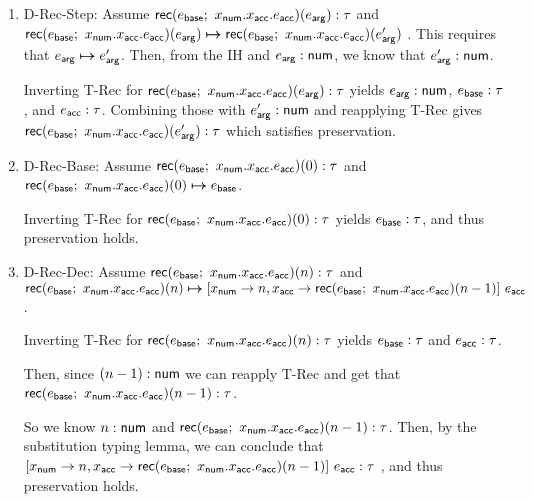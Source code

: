 \documentclass[11pt]{article}
\begin{document}
\begin{enumerate}
    \item D-Rec-Step: Assume 
    $\mathsf{rec}(e_{\mathsf{base}}; ~ x_{\mathsf{num}}.x_{\mathsf{acc}}.e_{\mathsf{acc}})(e_{\mathsf{arg}}) : \tau$
    and 
    $\mathsf{rec}(e_{\mathsf{base}}; ~ x_{\mathsf{num}}.x_{\mathsf{acc}}.e_{\mathsf{acc}})(e_{\mathsf{arg}}) \boldsymbol{\mapsto} \mathsf{rec}(e_{\mathsf{base}}; ~ x_{\mathsf{num}}.x_{\mathsf{acc}}.e_{\mathsf{acc}})(e_{\mathsf{arg}}')$
    . 
    This requires that $e_{\mathsf{arg}} \boldsymbol{\mapsto} e_{\mathsf{arg}}'$. Then, from the IH and 
    $e_{\mathsf{arg}} : \mathsf{num}$, we know that $e_{\mathsf{arg}}' : \mathsf{num}$. 
    
    Inverting T-Rec for 
    $\mathsf{rec}(e_{\mathsf{base}}; ~ x_{\mathsf{num}}.x_{\mathsf{acc}}.e_{\mathsf{acc}})(e_{\mathsf{arg}}) : \tau$
    yields $e_{\mathsf{arg}} : \mathsf{num}$, $e_{\mathsf{base}} : \tau$, and 
    $e_{\mathsf{acc}} : \tau$. Combining those with
    $e_{\mathsf{arg}}' : \mathsf{num}$ and reapplying T-Rec gives 
    $\mathsf{rec}(e_{\mathsf{base}}; ~ x_{\mathsf{num}}.x_{\mathsf{acc}}.e_{\mathsf{acc}})(e_{\mathsf{arg}}') : \tau$
    which satisfies preservation.
    
    \item D-Rec-Base: Assume
    $\mathsf{rec}(e_{\mathsf{base}}; ~ x_{\mathsf{num}}.x_{\mathsf{acc}}.e_{\mathsf{acc}})(0) : \tau$ and
    $\mathsf{rec}(e_{\mathsf{base}}; ~ x_{\mathsf{num}}.x_{\mathsf{acc}}.e_{\mathsf{acc}})(0) \boldsymbol{\mapsto} e_{\mathsf{base}}$.
    
    Inverting T-Rec for
    $\mathsf{rec}(e_{\mathsf{base}}; ~ x_{\mathsf{num}}.x_{\mathsf{acc}}.e_{\mathsf{acc}})(0) : \tau$
    yields $e_{\mathsf{base}} : \tau$, and thus preservation holds.
    
    \item D-Rec-Dec: Assume
    $\mathsf{rec}(e_{\mathsf{base}}; ~ x_{\mathsf{num}}.x_{\mathsf{acc}}.e_{\mathsf{acc}})(n) : \tau$ and
    $\steps
      {\rec{e_\msf{base}}{x_\msf{num}}{x_\msf{acc}}{e_\msf{acc}}{n}}
      {[x_\msf{num} \rightarrow n, x_\msf{acc} \rightarrow \rec{e_\msf{base}}{x_\msf{num}}{x_\msf{acc}}{e_\msf{acc}}{n-1}] \ e_\msf{acc}}$.
    
    Inverting T-Rec for
    $\mathsf{rec}(e_{\mathsf{base}}; ~ x_{\mathsf{num}}.x_{\mathsf{acc}}.e_{\mathsf{acc}})(n) : \tau$
    yields $e_{\mathsf{base}} : \tau$ and $e_{\mathsf{acc}} : \tau$.
    
    Then, since $(n-1) : \mathsf{num}$ we can reapply T-Rec and get that
    $\mathsf{rec}(e_{\mathsf{base}}; ~ x_{\mathsf{num}}.x_{\mathsf{acc}}.e_{\mathsf{acc}})(n-1) : \tau$.
    
    So we know $n : \mathsf{num}$ and 
    $\mathsf{rec}(e_{\mathsf{base}}; ~ x_{\mathsf{num}}.x_{\mathsf{acc}}.e_{\mathsf{acc}})(n-1) : \tau$.
    Then, by the substitution typing lemma, we can conclude that
    $\hasType{{[x_\msf{num} \rightarrow n, x_\msf{acc} \rightarrow 
    \rec{e_\msf{base}}{x_\msf{num}}{x_\msf{acc}}{e_\msf{acc}}{n-1}] \ e_\msf{acc}}}{\tau}$
    , and thus preservation holds.

\end{enumerate}{}
\end{document}
